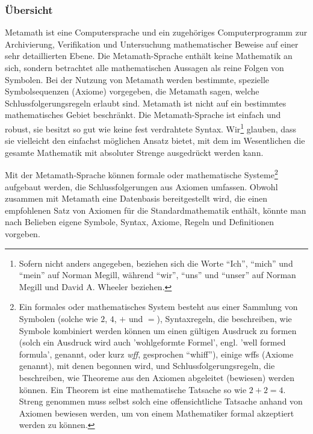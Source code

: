 
\subsubsection{Übersicht}

Metamath ist eine Computersprache und ein zugehöriges Computerprogramm zur Archivierung, Verifikation und Untersuchung mathematischer Beweise auf einer sehr detaillierten Ebene. Die Metamath-Sprache enthält keine Mathematik an sich, sondern betrachtet alle mathematischen Aussagen als reine Folgen von Symbolen. Bei der Nutzung von Metamath werden bestimmte, spezielle Symbolsequenzen (Axiome) vorgegeben, die Metamath sagen, welche Schlussfolgerungsregeln erlaubt sind. Metamath ist nicht auf ein bestimmtes mathematisches Gebiet beschränkt.  Die Metamath-Sprache ist einfach und robust, sie besitzt so gut wie keine fest verdrahtete Syntax. 
Wir\footnote{Sofern nicht anders angegeben, beziehen sich die Worte "`Ich"', "`mich"' und "`mein"' auf Norman Megill, während "`wir"', "`uns"' und "`unser"' auf Norman Megill und David A. Wheeler beziehen.}
glauben, dass sie vielleicht den einfachst möglichen Ansatz bietet, mit dem im Wesentlichen die gesamte Mathematik mit absoluter Strenge ausgedrückt werden kann.


Mit der Metamath-Sprache können formale oder mathematische Systeme\footnote{Ein formales oder mathematisches System besteht aus einer Sammlung von Symbolen (solche wie $2$, $4$, $+$ und $=$), Syntaxregeln, die beschreiben, wie Symbole kombiniert werden können um einen gültigen Ausdruck zu formen (solch ein Ausdruck wird auch 'wohlgeformte Formel', engl. 'well formed formula', genannt, oder kurz {\em wff}, gesprochen "`whiff"'), einige wffs (Axiome genannt), mit denen begonnen wird, und Schlussfolgerungsregeln, die beschreiben, wie Theoreme aus den Axiomen abgeleitet (bewiesen) werden können. Ein Theorem ist eine mathematische Tatsache so wie $2+2=4$. Streng genommen muss selbst solch eine offensichtliche Tatsache anhand von Axiomen bewiesen werden, um von einem Mathematiker formal akzeptiert werden zu können.} aufgebaut werden, die Schlussfolgerungen aus Axiomen umfassen.  Obwohl zusammen mit Metamath eine Datenbasis bereitgestellt wird, die einen empfohlenen Satz von Axiomen für die Standardmathematik enthält, könnte man nach Belieben eigene Symbole, Syntax, Axiome, Regeln und Definitionen vorgeben.

